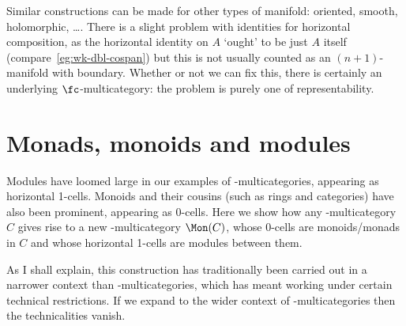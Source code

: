 \begin{example}
Similar constructions can be made for other types of manifold: oriented,
smooth, holomorphic, \ldots.  There is a slight problem with identities for
horizontal composition, as the horizontal identity on $A$ `ought' to be
just $A$ itself (compare~\ref{eg:wk-dbl-cospan}) but this is not usually
counted as an $(n+1)$-manifold with boundary.  Whether or not we can fix
this, there is certainly an underlying $\fc$-multicategory: the problem is
purely one of representability.
\end{example}





\section{Monads, monoids and modules}


Modules have loomed large in our examples of \fc-multicategories, appearing
as horizontal 1-cells.  Monoids and their cousins (such as rings and
categories) have also been prominent, appearing as 0-cells.  Here we show
how any \fc-multicategory $C$ gives rise to a new \fc-multicategory
$\Mon(C)$, whose 0-cells are monoids/monads in $C$ and whose horizontal
1-cells are modules between them.  

As I shall explain, this construction has traditionally been carried out in
a narrower context than \fc-multicategories, which has meant working under
certain technical restrictions.  If we expand to the wider context of
\fc-multicategories then the technicalities vanish.  


